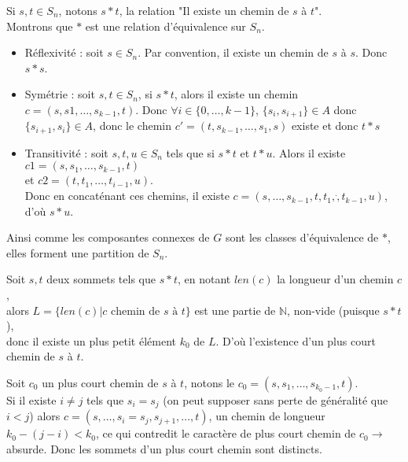 \documentclass{article}
\newcommand{\bb}[1]{\mathbb{#1}}
\begin{document}
\begin{question}
    \item Si $s, t \in S_n$, notons $s \ast t$, la relation "Il existe un
    chemin de $s$ à $t$". \\
    Montrons que $\ast$ est une relation d'équivalence sur $S_n$.
    
    \begin{itemize}
        \item Réflexivité : soit $s \in S_n$. Par convention, il existe 
        un chemin de $s$ à $s$. Donc $s \ast s$.

        \item Symétrie : soit $s, t \in S_n$, si $s \ast t$, alors il existe 
        un chemin $c = (s, s1, \hdots, s_{k - 1}, t)$. 
        Donc $\forall i \in \{0, \hdots, k - 1\}$, $\{s_i, s_{i + 1}\} \in A$
        donc $\{s_{i + 1}, s_i\} \in A$, donc le chemin 
        $c' = (t, s_{k - 1}, \hdots, s_1, s)$ existe et donc $t \ast s$

        \item Transitivité : soit $s, t, u \in S_n$ tels que si $s \ast t$ et
        $t \ast u$. Alors il existe $c1 = (s, s_1, \hdots, s_{k - 1}, t)$ \\
        et $c2 = (t, t_1, \hdots, t_{i - 1}, u)$. \\
        Donc en concaténant ces chemins, il existe 
        $c = (s, \hdots, s_{k - 1}, t, t_1, \dot, t_{k - 1}, u)$, 
        d'où $s \ast u$.
    \end{itemize}

    Ainsi comme les composantes connexes de $G$ sont les classes d'équivalence
    de $\ast$, elles forment une partition de $S_n$.

    \item Soit $s, t$ deux sommets tels que $s \ast t$, en notant $len(c)$ la
    longueur d'un chemin $c$, \\ alors 
    $L = \{ len(c) \vert c \text{ chemin de $s$ à $t$}\}$ est une partie de
    $\bb{N}$, non-vide (puisque $s \ast t$), \\ donc il existe un plus petit 
    élément $k_0$ de $L$. D'où l'existence d'un plus court chemin de $s$ à $t$.

    Soit $c_0$ un plus court chemin de $s$ à $t$, notons le
    $c_0 = (s, s_1, \hdots, s_{k_0 - 1}, t)$. \\
    Si il existe $i \neq j$ tels que $s_i = s_j$ (on peut supposer sans perte
    de généralité que $i < j$) alors $c = (s, \hdots, s_i = s_j, s_{j + 1}, 
    \hdots, t)$, un chemin de longueur $k_0 - (j - i) < k_0$, ce qui contredit
    le caractère de plus court chemin de $c_0 \rightarrow$ absurde. Donc les
    sommets d'un plus court chemin sont distincts.


\end{question}
\end{document}
